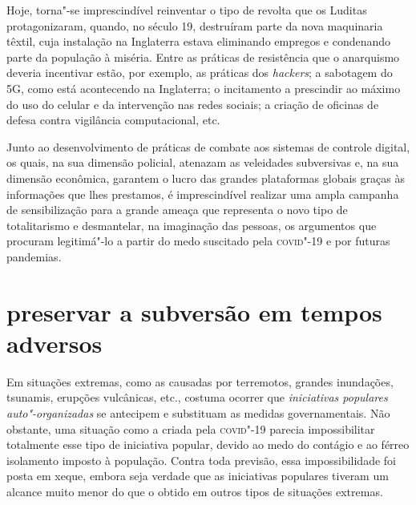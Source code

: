 Hoje, torna"-se imprescindível reinventar o tipo de revolta que os
Luditas protagonizaram, quando, no século 19, destruíram parte da nova
maquinaria têxtil, cuja instalação na Inglaterra estava eliminando
empregos e condenando parte da população à miséria. Entre as práticas de
resistência que o anarquismo deveria incentivar estão, por exemplo, as
práticas dos \emph{hackers}; a sabotagem do 5G, como está acontecendo na
Inglaterra; o incitamento a prescindir ao máximo do uso do celular e da
intervenção nas redes sociais; a criação de oficinas de defesa contra
vigilância computacional, etc.

Junto ao desenvolvimento de práticas de combate aos sistemas de controle
digital, os quais, na sua dimensão policial, atenazam as veleidades
subversivas e, na sua dimensão econômica, garantem o lucro das grandes
plataformas globais graças às informações que lhes prestamos, é
imprescindível realizar uma ampla campanha de sensibilização para a
grande ameaça que representa o novo tipo de totalitarismo e desmantelar,
na imaginação das pessoas, os argumentos que procuram legitimá"-lo a
partir do medo suscitado pela \textsc{covid}"-19 e por futuras pandemias.

\section{preservar a subversão em tempos adversos}

Em situações extremas, como as causadas por terremotos, grandes
inundações, tsunamis, erupções vulcânicas, etc., costuma ocorrer que
\textit{iniciativas populares auto"-organizadas} se antecipem e
substituam as medidas governamentais. Não obstante, uma situação como a
criada pela \textsc{covid}"-19 parecia impossibilitar totalmente esse tipo de
iniciativa popular, devido ao medo do contágio e ao férreo isolamento
imposto à população. Contra toda previsão, essa impossibilidade foi
posta em xeque, embora seja verdade que as iniciativas populares tiveram
um alcance muito menor do que o obtido em outros tipos de situações
extremas.

